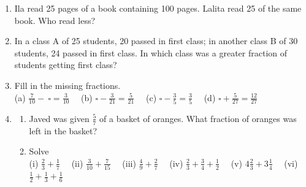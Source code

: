 \documentclass[a4paper,leqno,12pt]{amsart}
\begin{document}
\begin{enumerate}
\item Ila read 25 pages of a book containing 100 pages. Lalita read 25 of the same book. Who read less?

\item In a class A of 25 students, 20 passed in first class; in another class B of 30
students, 24 passed in first class. In which class was a greater fraction of students
getting first class?

\item Fill in the missing fractions.\\

(a) $\frac{7}{10} - \ \square = \frac{3}{10} \quad$ (b) $\square - \frac{3}{21} = \frac{5}{21} \quad$ (c) $\square - \frac{3}{5} = \frac{3}{5} \quad$ (d) $\square + \frac{5}{27} = \frac{12}{27} \quad$ 

\item 
\begin{enumerate}
\item Javed was given $\frac{5}{7}$ of a basket of oranges. What fraction of oranges was left in the basket?

\item Solve\\
(i) $\frac{2}{3} + \frac{1}{7} \quad$ (ii) $\frac{3}{10} + \frac{7}{15} \quad$ (iii) $\frac{4}{9} + \frac{2}{7} \quad$ (iv) $\frac{2}{3} + \frac{3}{4} + \frac{1}{2} \quad$ (v) $4\frac{2}{3} + 3\frac{1}{4} \quad$
(vi) $\frac{1}{2} + \frac{1}{3} + \frac{1}{6}$
\end{enumerate}
\end{enumerate}


\end{document}
